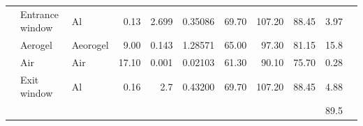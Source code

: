 \begin{table}[h]
{\begin{tabular}[t]{| l | l | l | r | r | r | r | r | r | r | r |}
            \hline
            & Entrance window                                 & Al                                    & 0.13                           & 2.699                                     & 0.35086                              & 69.70                                          & 107.20                                         & 88.45                                              & 3.97\\ 
            & Aerogel                                         & Aeorogel                              & 9.00                           & 0.143                                     & 1.28571                              & 65.00                                          & 97.30                                          & 81.15                                              & 15.8\\ 
            & Air                                             & Air                                   & 17.10                          & 0.001                                     & 0.02103                              & 61.30                                          & 90.10                                          & 75.70                                              & 0.28\\ 
            & Exit window                                     & Al                                    & 0.16                           & 2.7                                       & 0.43200                              & 69.70                                          & 107.20                                         & 88.45                                              & 4.88\\ \hline
            \hline

            \hline
            &                                                 &                                       &                                &                                           &                                      &                                                &                                                &                                                    & 89.5\\ \hline


\end{tabular}}
\end{table}
